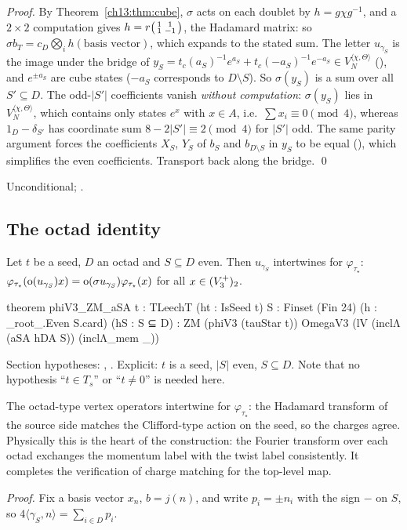 \noindent\emph{Proof.} By Theorem~\ref{ch13:thm:cube}, $\sigma$ acts on each doublet by $h=g\chi g^{-1}$, and a
$2\times2$ computation gives $h=r\begin{psmallmatrix}1&1\\1&-1\end{psmallmatrix}$, the Hadamard matrix: so
$\sigma b_T=c_D\bigotimes_i h(\text{basis vector})$, which expands to the stated sum. The letter $u_{\gamma_S}$ is the image
under the bridge of $y_S=t_c(a_S)^{-1}e^{a_S}+t_c(-a_S)^{-1}e^{-a_S}\in V_N^{\langle\chi,\Theta\rangle}$
(), and $e^{\pm a_S}$ are cube states ($-a_S$ corresponds to $D\setminus S$). So $\sigma(y_S)$ is a
sum over all $S'\subseteq D$. The odd-$|S'|$ coefficients vanish \emph{without computation}: $\sigma(y_S)$ lies in
$V_N^{\langle\chi,\Theta\rangle}$, which contains only states $e^{x}$ with $x\in A$, i.e.\ $\sum x_i\equiv0\pmod4$, whereas
$1_D-\delta_{S'}$ has coordinate sum $8-2|S'|\equiv2\pmod4$ for $|S'|$ odd. The same parity argument forces the
coefficients $X_S$, $Y_S$ of $b_S$ and $b_{D\setminus S}$ in $y_S$ to be equal (), which simplifies
the even coefficients. Transport back along the bridge. \qed
\begin{status}Unconditional; .\end{status}

\subsection{The octad identity}
\begin{theorem}\label{ch13:thm:octad}
Let $t$ be a seed, $D$ an octad and $S\subseteq D$ even. Then $u_{\gamma_S}$ intertwines for $\varphi_{\tau_\star}$:
$\varphi_{\tau_\star}(\operatorname{o}(u_{\gamma_S})x)=\operatorname{o}(\sigma u_{\gamma_S})\varphi_{\tau_\star}(x)$ for all $x\in(V_3^{+})_2$.
\end{theorem}
\begin{leancode}
theorem phiV3_ZM_aSA {t : TLeechT} (ht : IsSeed t) {S : Finset (Fin 24)} (h : _root_.Even S.card)
    (hS : S ⊆ D) : ZM (phiV3 (tauStar t)) OmegaV3 (lV (inclΛ (aSA hDA S)) (inclΛ_mem _))
\end{leancode}
\begin{dictionary}
Section hypotheses: , . Explicit: $t$ is a seed,
$|S|$ even, $S\subseteq D$. Note that no hypothesis ``$t\in T_s$'' or ``$t\ne0$'' is needed here.
\end{dictionary}
\begin{physics}
The octad-type vertex operators intertwine for $\varphi_{\tau_\star}$: the Hadamard transform of the source side matches the Clifford-type action on the seed, so the charges agree. Physically this is the heart of the construction: the Fourier transform over each octad exchanges the momentum label with the twist label consistently. It completes the verification of charge matching for the top-level map.
\end{physics}
\noindent\emph{Proof.} Fix a basis vector $x_n$, $b=j(n)$, and write $p_i=\pm n_i$ with the sign $-$ on $S$, so
$4\langle\gamma_S,n\rangle=\sum_{i\in D}p_i$.

